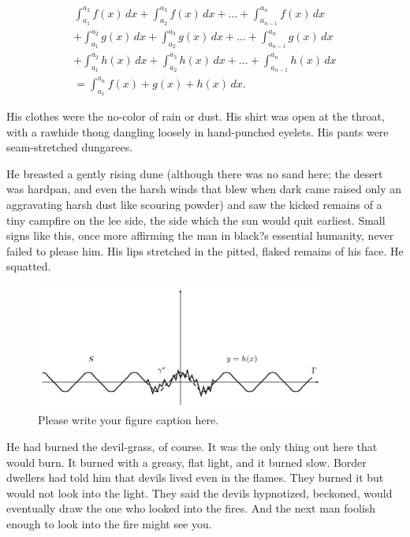 \documentclass[
11pt,%
tightenlines,%
twoside,%
onecolumn,%
nofloats,%
nobibnotes,%
nofootinbib,%
superscriptaddress,%
noshowpacs,%
centertags]%
{revtex4}
\begin{document}
\begin{multline}
\int_{a_1}^{a_2} f(x)\,dx+\int_{a_2}^{a_3} f(x)\,dx
+\dots+\int_{a_{n-1}}^{a_n} f(x)\,dx\\
+\int_{a_1}^{a_2} g(x)\,dx+\int_{a_2}^{a_3} g(x)\,dx
+\dots+\int_{a_{n-1}}^{a_n} g(x)\,dx\\
+\int_{a_1}^{a_2} h(x)\,dx+\int_{a_2}^{a_3} h(x)\,dx
+\dots+\int_{a_{n-1}}^{a_n} h(x)\,dx\\
=\int_{a_1}^{a_n} f(x)+g(x)+h(x)\,dx.
\end{multline}

His clothes were the no-color of rain or dust. His shirt was open at the throat, with a rawhide thong dangling loosely in hand-punched eyelets. His pants were seam-stretched dungarees.

He breasted a gently rising dune (although there was no sand here; the desert was hardpan, and even the harsh winds that blew when dark came raised only an aggravating harsh dust like scouring powder) and saw the kicked remains of a tiny campfire on the lee side, the side which the sun would quit earliest. Small signs like this, once more affirming the man in black?s essential humanity, never failed to please him. His lips stretched in the pitted, flaked remains of his face. He squatted.

\begin{figure}[h]
\setcaptionmargin{5mm}
\onelinecaptionstrue  %
\includegraphics[width=0.85\textwidth]{deform.eps}
\caption{Please write your figure caption here.}\label{fig:1}
\end{figure}

He had burned the devil-grass, of course. It was the only thing out here that would burn. It burned with a greasy, flat light, and it burned slow. Border dwellers had told him that devils lived even in the flames. They burned it but would not look into the light. They said the devils hypnotized, beckoned, would eventually draw the one who looked into the fires. And the next man foolish enough to look into the fire might see you.
\end{document}
